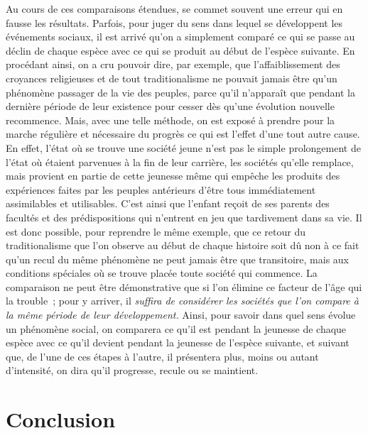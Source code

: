 \documentclass[french,twoside]{book} %
\newcommand\chapterclose{} %
\begin{document}
Au cours de ces comparaisons étendues, se commet souvent une erreur qui en fausse les résultats. Parfois, pour juger du sens dans lequel se développent les événements sociaux, il est arrivé qu’on a simplement comparé ce qui se passe au déclin de chaque espèce avec ce qui se produit au début de l’espèce suivante. En procédant ainsi, on a cru pouvoir dire, par exemple, que l’affaiblissement des croyances religieuses et de tout traditionalisme ne pouvait jamais être qu’un phénomène passager de la vie des peuples, parce qu’il n’apparaît que pendant la dernière période de leur existence pour cesser dès qu’une évolution nouvelle recommence. Mais, avec une telle méthode, on est exposé à prendre pour la marche régulière et nécessaire du progrès ce qui est l’effet d’une tout autre cause. En effet, l’état où se trouve une société jeune n’est pas le simple prolongement de l’état où étaient parvenues à la fin de leur carrière, les sociétés qu’elle remplace, mais provient en partie de cette jeunesse même qui empêche les produits des expériences faites par les peuples antérieurs d’être tous immédiatement assimilables et utilisables. C’est ainsi que l’enfant reçoit de ses parents des facultés et des prédispositions qui n’entrent en jeu que tardivement dans sa vie. Il est donc possible, pour reprendre le même exemple, que ce retour du traditionalisme que l’on observe au début de chaque histoire soit dû non à ce fait qu’un recul du même phénomène ne peut jamais être que transitoire, mais aux conditions spéciales où se trouve placée toute société qui commence. La comparaison ne peut être démonstrative que si l’on élimine ce facteur de l’âge qui la trouble ; pour y arriver, il {\itshape suffira de considérer les sociétés que l’on compare à la même période de leur développement.} Ainsi, pour savoir dans quel sens évolue un phénomène social, on comparera ce qu’il est pendant la jeunesse de chaque espèce avec ce qu’il devient pendant la jeunesse de l’espèce suivante, et suivant que, de l’une de ces étapes à l’autre, il présentera plus, moins ou autant d’intensité, on dira qu’il progresse, recule ou se maintient.
\chapterclose

\section[{Conclusion}]{Conclusion}
\label{conclusion}\renewcommand{\leftmark}{Conclusion}
\end{document}
